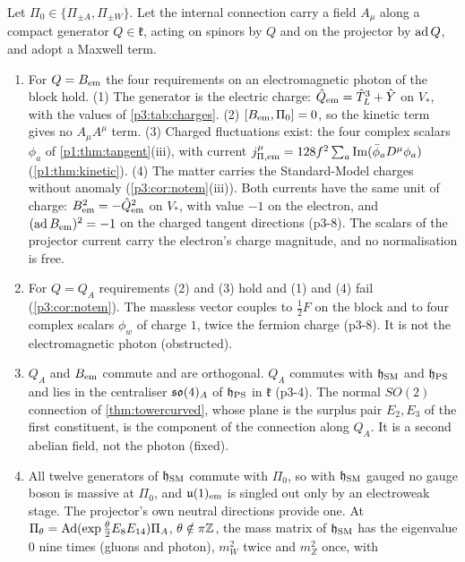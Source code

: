 \begin{theorem}
\label{p3:thm:photon}
Let $\Pi_0\in\{\Pi_{\pm A},\Pi_{\pm W}\}$. Let the internal connection carry a field $A_\mu$ along a compact generator $Q\in\mathfrak k$, acting on spinors by $Q$ and on the
projector by $\ad Q$, and adopt a Maxwell term.
\begin{enumerate}[label=(\alph*),leftmargin=2.2em]
\item For $Q=B_{\rm em}$ the four requirements on an electromagnetic photon of the block hold. (1) The generator is the electric charge: $\hat Q_{\rm em}=\hat T^3_L+\hat Y$ on
$V_*$, with the values of \cref{p3:tab:charges}. (2) $[B_{\rm em},\Pi_0]=0$, so the kinetic term gives no $A_\mu A^\mu$ term. (3) Charged fluctuations exist: the four complex
scalars $\phi_a$ of \cref{p1:thm:tangent}(iii), with current $j^\mu_{\Pi,\rm em}=128f^2\sum_a\Im(\bar\phi_aD^\mu\phi_a)$ (\cref{p1:thm:kinetic}). (4) The matter carries the
Standard-Model charges without anomaly (\cref{p3:cor:notem}(iii)). Both currents have the same unit of charge: $B_{\rm em}^2=-\hat Q_{\rm em}^2$ on $V_*$, with value $-1$ on
the electron, and $(\ad B_{\rm em})^2=-1$ on the charged tangent directions (p3-8). The scalars of the projector current carry the electron's charge magnitude, and no
normalisation is free.
\item For $Q=Q_A$ requirements (2) and (3) hold and (1) and (4) fail (\cref{p3:cor:notem}). The massless vector couples to $\tfrac12F$ on the block and to four complex
scalars $\phi_w$ of charge $1$, twice the fermion charge (p3-8). It is not the electromagnetic photon (obstructed).
\item $Q_A$ and $B_{\rm em}$ commute and are orthogonal. $Q_A$ commutes with $\mathfrak h_{\rm SM}$ and $\mathfrak h_{\rm PS}$ and lies in the centraliser $\so4_A$ of
$\mathfrak h_{\rm PS}$ in $\mathfrak k$ (p3-4). The normal $SO(2)$ connection of \cref{thm:towercurved}, whose plane is the surplus pair $E_2,E_3$ of the first
constituent, is the component of the connection along $Q_A$. It is a second abelian field, not the photon (fixed).
\item All twelve generators of $\mathfrak h_{\rm SM}$ commute with $\Pi_0$, so with $\mathfrak h_{\rm SM}$ gauged no gauge boson is massive at $\Pi_0$, and $\uu1_{\rm em}$
is singled out only by an electroweak stage. The projector's own neutral directions provide one. At $\Pi_\theta=\Ad(\exp\tfrac\theta2E_8E_{14})\Pi_A$, $\theta\notin\pi\Z$, the
mass matrix of $\mathfrak h_{\rm SM}$ has the eigenvalue $0$ nine times (gluons and photon), $m_W^2$ twice and $m_Z^2$ once, with

\end{enumerate}
\end{theorem}
